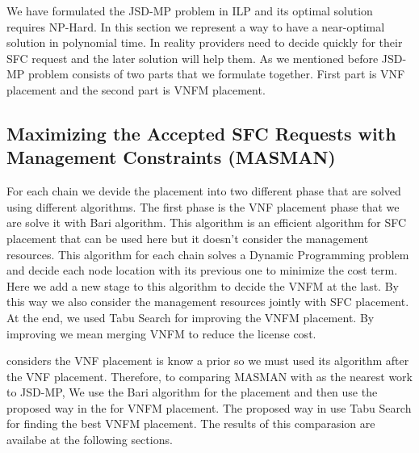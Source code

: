 We have formulated the JSD-MP problem in ILP and its optimal solution requires NP-Hard.
In this section we represent a way to have a near-optimal solution in polynomial time.
In reality providers need to decide quickly for their SFC request and the later solution will help them.
As we mentioned before JSD-MP problem consists of two parts that we formulate together.
First part is VNF placement and the second part is VNFM placement.

\subsection{Maximizing the Accepted SFC Requests with Management Constraints (MASMAN)}
For each chain we devide the placement into two different phase that are solved using different algorithms.
The first phase is the VNF placement phase that we are solve it with Bari \cite{Bari2015} algorithm.
This algorithm is an efficient algorithm for SFC placement that can be used here but it doesn't consider the management resources.
This algorithm for each chain solves a Dynamic Programming problem and decide each node location with its previous one to minimize the cost term.
Here we add a new stage to this algorithm to decide the VNFM at the last. By this way we also consider the management resources jointly with SFC placement.
At the end, we used Tabu Search for improving the VNFM placement. By improving we mean merging VNFM to reduce the license cost.


\cite{AbuLebdeh2017} considers the VNF placement is know a prior so we must used its algorithm after the VNF placement.
Therefore, to comparing MASMAN with \cite{AbuLebdeh2017} as the nearest work to JSD-MP,
We use the Bari \cite{Bari2015} algorithm for the placement and then use the proposed way in the \cite{AbuLebdeh2017} for VNFM placement.
The proposed way in \cite{AbuLebdeh2017} use Tabu Search for finding the best VNFM placement.
The results of this comparasion are availabe at the following sections.

